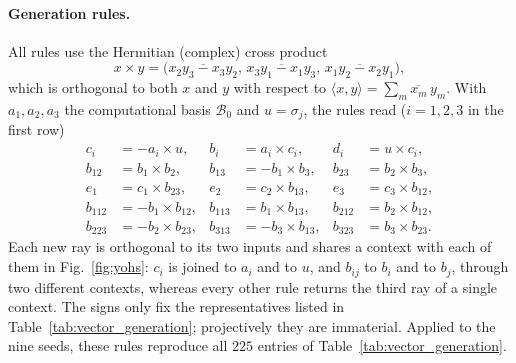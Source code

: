 \documentclass[%
  reprint,
  superscriptaddress,
  showkeys,
  amsmath,amssymb,
  aps,pra,
  longbibliography,
  floatfix,
  x11names
]{revtex4-2}
\begin{document}
{\color{blue}\paragraph*{Generation rules.}
All rules use the Hermitian (complex) cross product~\cite{harding2025remarksIJTP}
\[
x\times y=\bigl(\overline{x_2y_3-x_3y_2},\,\overline{x_3y_1-x_1y_3},\,\overline{x_1y_2-x_2y_1}\bigr),
\]
which is orthogonal to both $x$ and $y$ with respect to $\langle x,y\rangle=\sum_m\overline{x_m}\,y_m$.  With $a_1,a_2,a_3$ the computational basis $\mathcal{B}_0$ and $u=\sigma_j$, the rules read ($i=1,2,3$ in the first row)
\begin{align*}
c_i&=-a_i\times u, & b_i&=a_i\times c_i, & d_i&=u\times c_i,\\
b_{12}&=b_1\times b_2, & b_{13}&=-b_1\times b_3, & b_{23}&=b_2\times b_3,\\
e_1&=c_1\times b_{23}, & e_2&=c_2\times b_{13}, & e_3&=c_3\times b_{12},\\
b_{112}&=-b_1\times b_{12}, & b_{113}&=b_1\times b_{13}, & b_{212}&=b_2\times b_{12},\\
b_{223}&=-b_2\times b_{23}, & b_{313}&=-b_3\times b_{13}, & b_{323}&=b_3\times b_{23}.
\end{align*}
Each new ray is orthogonal to its two inputs and shares a context with each of them in Fig.~\ref{fig:yohs}: $c_i$ is joined to $a_i$ and to $u$, and $b_{ij}$ to $b_i$ and to $b_j$, through two different contexts, whereas every other rule returns the third ray of a single context.  The signs only fix the representatives listed in Table~\ref{tab:vector_generation}; projectively they are immaterial.  Applied to the nine seeds, these rules reproduce all $225$ entries of Table~\ref{tab:vector_generation}.\par}
\end{document}
